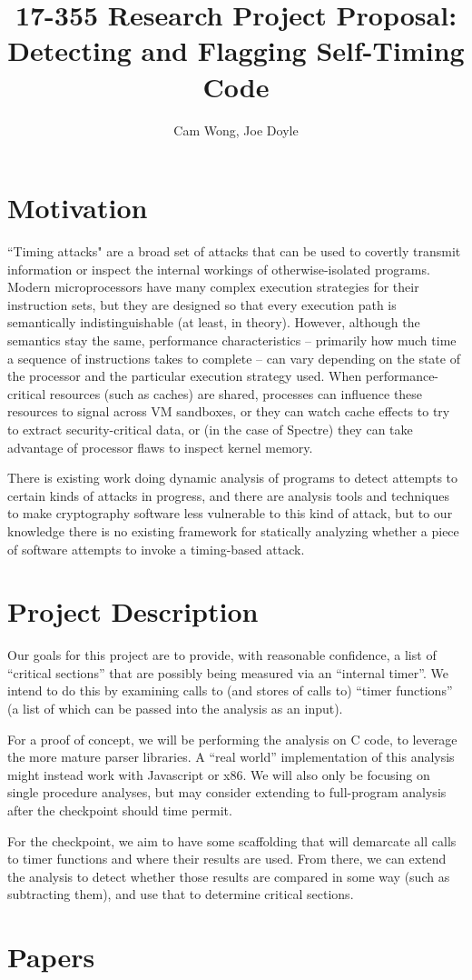 \documentclass[twocolumn]{article}
\title{17-355 Research Project Proposal: Detecting and Flagging Self-Timing
Code}
\author{Cam Wong, Joe Doyle}
\begin{document}
\maketitle

\section{Motivation}

``Timing attacks" are a broad set of attacks that can be used to
covertly transmit information or inspect the internal workings of
otherwise-isolated programs. Modern microprocessors have many complex
execution strategies for their instruction sets, but they are designed
so that every execution path is semantically indistinguishable (at
least, in theory). However, although the semantics stay the same,
performance characteristics -- primarily how much time a sequence of
instructions takes to complete -- can vary depending on the state of
the processor and the particular execution strategy used. When
performance-critical resources (such as caches) are shared, processes
can influence these resources to signal across VM sandboxes, or they
can watch cache effects to try to extract security-critical data, or
(in the case of Spectre) they can take advantage of processor flaws to
inspect kernel memory.

There is existing work doing dynamic analysis of programs to detect
attempts to certain kinds of attacks in progress, and there are
analysis tools and techniques to make cryptography software less
vulnerable to this kind of attack, but to our knowledge there is no
existing framework for statically analyzing whether a piece of
software attempts to invoke a timing-based attack.

\section{Project Description}

Our goals for this project are to provide, with reasonable confidence,
a list of ``critical sections'' that are possibly being measured via
an ``internal timer''. We intend to do this by examining calls to (and
stores of calls to) ``timer functions'' (a list of which can be passed
into the analysis as an input).

For a proof of concept, we will be performing the analysis on C code,
to leverage the more mature parser libraries. A ``real world''
implementation of this analysis might instead work with Javascript or
x86. We will also only be focusing on single procedure analyses, but
may consider extending to full-program analysis after the checkpoint
should time permit.

For the checkpoint, we aim to have some scaffolding that will demarcate
all calls to timer functions and where their results are used. From there,
we can extend the analysis to detect whether those results are compared
in some way (such as subtracting them), and use that to determine critical
sections.

\section{Papers}
\end{document}
